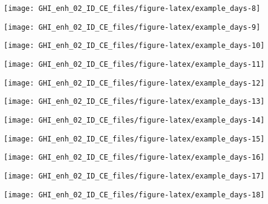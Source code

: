\documentclass[
  10pt,
  a4paper,oneside]{article}
\begin{document}
\begin{center}\texttt{[image: GHI\_enh\_02\_ID\_CE\_files/figure-latex/example\_days-8]} \end{center}

\begin{center}\texttt{[image: GHI\_enh\_02\_ID\_CE\_files/figure-latex/example\_days-9]} \end{center}

\begin{center}\texttt{[image: GHI\_enh\_02\_ID\_CE\_files/figure-latex/example\_days-10]} \end{center}

\begin{center}\texttt{[image: GHI\_enh\_02\_ID\_CE\_files/figure-latex/example\_days-11]} \end{center}

\begin{center}\texttt{[image: GHI\_enh\_02\_ID\_CE\_files/figure-latex/example\_days-12]} \end{center}

\begin{center}\texttt{[image: GHI\_enh\_02\_ID\_CE\_files/figure-latex/example\_days-13]} \end{center}

\begin{center}\texttt{[image: GHI\_enh\_02\_ID\_CE\_files/figure-latex/example\_days-14]} \end{center}

\begin{center}\texttt{[image: GHI\_enh\_02\_ID\_CE\_files/figure-latex/example\_days-15]} \end{center}

\begin{center}\texttt{[image: GHI\_enh\_02\_ID\_CE\_files/figure-latex/example\_days-16]} \end{center}

\begin{center}\texttt{[image: GHI\_enh\_02\_ID\_CE\_files/figure-latex/example\_days-17]} \end{center}

\begin{center}\texttt{[image: GHI\_enh\_02\_ID\_CE\_files/figure-latex/example\_days-18]} \end{center}
\end{document}
